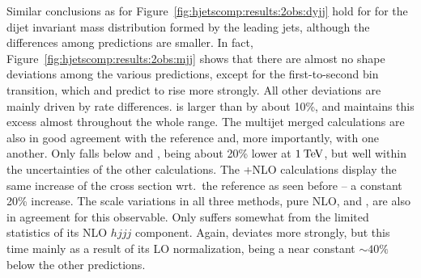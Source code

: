 Similar conclusions as for Figure~\ref{fig:hjetscomp:results:2obs:dyjj} 
hold for for the dijet invariant mass distribution formed by the 
leading jets, although the differences among predictions are smaller.
In fact, Figure~\ref{fig:hjetscomp:results:2obs:mjj} shows that there
are almost no shape deviations among the various predictions, except
for the first-to-second bin transition, which \Powheg and \MGaMC
predict to rise more strongly. All other deviations are mainly driven
by rate differences. \Sherpa \NNLOPS is larger than \Powheg \NNLOPS
by about 10\%, and maintains this excess almost throughout the whole
range. The multijet merged calculations are also in good agreement
with the \Powheg reference and, more importantly, with one another. Only
\MGaMC falls below \Herwig and \Sherpa \MEPSatNLO, being about 20\%
lower at $1\text{\:TeV}$, but well within the uncertainties of the other
calculations. The \GoSam{}+\Sherpa NLO calculations display the same
increase of the cross section wrt.~the reference as seen before -- a
constant 20\% increase. The scale variations in all three methods,
pure NLO, \Minlo and \Loopsim, are also in agreement for this
observable. Only \Loopsim suffers somewhat from the limited statistics
of its NLO $hjjj$ component. Again, \Hej deviates more strongly,
but this time mainly as a result of its LO normalization, being a
near constant $\sim 40\%$ below the other predictions.


